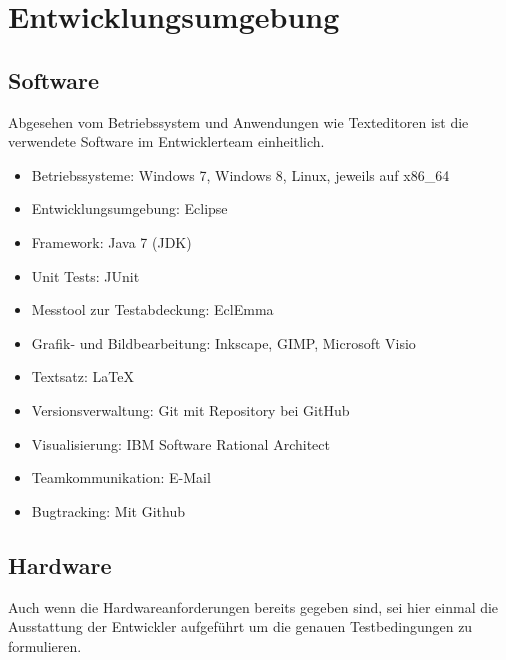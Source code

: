 \documentclass[10pt]{scrreprt}
\begin{document}
\chapter{Entwicklungsumgebung}
\section{Software}
Abgesehen vom Betriebssystem und Anwendungen wie Texteditoren ist die verwendete Software im Entwicklerteam einheitlich.
\begin{itemize}
\item Betriebssysteme: Windows 7, Windows 8, Linux, jeweils auf x86{\_}64
\item Entwicklungsumgebung: Eclipse
\item Framework: Java 7 (JDK)
\item Unit Tests: JUnit
\item Messtool zur Testabdeckung: EclEmma
\item Grafik- und Bildbearbeitung: Inkscape, GIMP, Microsoft Visio
\item Textsatz: \LaTeX
\item Versionsverwaltung: Git mit Repository bei GitHub
\item Visualisierung: IBM Software Rational Architect
\item Teamkommunikation: E-Mail
\item Bugtracking: Mit Github
\end{itemize}


\section{Hardware}
Auch wenn die Hardwareanforderungen bereits gegeben sind, sei hier einmal die Ausstattung der Entwickler aufgeführt um die genauen Testbedingungen zu formulieren.

\vspace{0.5cm}
\end{document}
